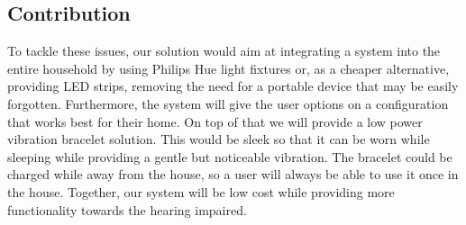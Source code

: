 \subsection{Contribution}
To tackle these issues, our solution would aim at integrating a system into the entire household by using Philips Hue light fixtures or, as a cheaper alternative, providing LED strips, removing the need for a portable device that may be easily forgotten. Furthermore, the system will give the user options on a configuration that works best for their home. On top of that we will provide a low power vibration bracelet solution. This would be sleek so that it can be worn while sleeping while providing a gentle but noticeable vibration. The bracelet could be charged while away from the house, so a user will always be able to use it once in the house. Together, our system will be low cost while providing more functionality towards the hearing impaired.
